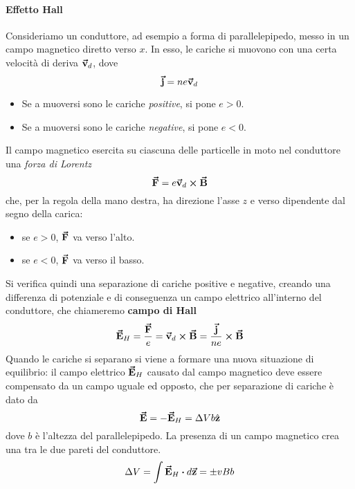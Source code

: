 \paragraph{Effetto Hall} %
Consideriamo un conduttore, ad esempio a forma di parallelepipedo, messo in un campo magnetico diretto verso $x$.
In esso, le cariche si muovono con una certa velocità di deriva $\vb*{\va{v}}_d$, dove
\begin{equation*}
	\vb*{\va{j}}=ne\vb*{\va{v}}_d
\end{equation*}
\begin{itemize}
	\item Se a muoversi sono le cariche \textit{positive}, si pone $e>0$.
	\item Se a muoversi sono le cariche \textit{negative}, si pone $e<0$.
\end{itemize}
Il campo magnetico esercita su ciascuna delle particelle in moto nel conduttore una \textit{forza di Lorentz}
\begin{equation*}
	\vb*{\va{F}}=e\vb*{\va{v}}_d\cross\vb*{\va{B}}
\end{equation*}
che, per la regola della mano destra, ha direzione l'asse $z$ e verso dipendente dal segno della carica:
\begin{itemize}
	\item se $e>0$, $\vb*{\va{F}}$ va verso l'alto.
	\item se $e<0$, $\vb*{\va{F}}$ va verso il basso.
\end{itemize}
Si verifica quindi una separazione di cariche positive e negative, creando una differenza di potenziale e di conseguenza un campo elettrico all'interno del conduttore, che chiameremo \textbf{campo di Hall} %
\begin{equation}
	\vb*{\va{E}}_H=\frac{\vb*{\va{F}}}{e}=\vb*{\va{v}}_d\cross\vb*{\va{B}}=\frac{\vb*{\va{j}}}{ne}\cross\vb*{\va{B}}
\end{equation}
Quando le cariche si separano si viene a formare una nuova situazione di equilibrio: il campo elettrico  $\vb*{\va{E}}_H$ causato dal campo magnetico deve essere compensato da un campo uguale ed opposto, che per separazione di cariche è dato da
\begin{equation}
	\vb*{\va{E}}=-\vb*{\va{E}}_H=\Delta V b\hat{\mathbf{z}}
\end{equation}
dove $b$ è l'altezza del parallelepipedo. La presenza di un campo magnetico crea una \ddp tra le due pareti del conduttore.
\begin{equation*}
	\Delta V=\int \vba{E}_H\vdot d\vba{z}=\pm vBb
\end{equation*}
